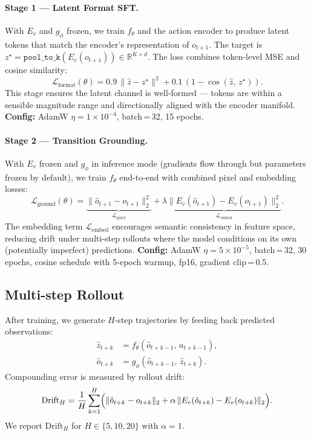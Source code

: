 \documentclass[11pt]{article}
\begin{document}
\paragraph{Stage 1 — Latent Format SFT.}
With $E_v$ and $g_\phi$ frozen, we train $f_\theta$ and the action encoder
to produce latent tokens that match the encoder's representation of $o_{t+1}$.
The target is $z^\star = \texttt{pool\_to\_k}(E_v(o_{t+1})) \in \mathbb{R}^{K \times d}$.
The loss combines token-level MSE and cosine similarity:
\begin{equation}
\mathcal{L}_\text{format}(\theta) = 0.9\,\|{\hat{z} - z^\star}\|^2
+ 0.1\,(1 - \cos(\hat{z},\, z^\star)).
\end{equation}
This stage ensures the latent channel is well-formed --- tokens are within
a sensible magnitude range and directionally aligned with the encoder manifold.
\textbf{Config:} AdamW $\eta=1\times10^{-4}$, batch\,=\,32, 15 epochs.

\paragraph{Stage 2 — Transition Grounding.}
With $E_v$ frozen and $g_\phi$ in inference mode (gradients flow through but
parameters frozen by default), we train $f_\theta$ end-to-end with combined
pixel and embedding losses:
\begin{equation}
\mathcal{L}_\text{ground}(\theta) =
\underbrace{\|{\hat{o}_{t+1} - o_{t+1}}\|_2^2}_{\mathcal{L}_\text{pixel}}
+ \lambda\underbrace{\|{E_v(\hat{o}_{t+1}) - E_v(o_{t+1})}\|_2^2}_{\mathcal{L}_\text{embed}}.
\end{equation}
The embedding term $\mathcal{L}_\text{embed}$ encourages semantic consistency
in feature space, reducing drift under multi-step rollouts where the model
conditions on its own (potentially imperfect) predictions.
\textbf{Config:} AdamW $\eta=5\times10^{-5}$, batch\,=\,32, 30 epochs,
cosine schedule with 5-epoch warmup, fp16, gradient clip\,=\,0.5.

\subsection{Multi-step Rollout}

After training, we generate $H$-step trajectories by feeding back
predicted observations:
\begin{align}
\hat{z}_{t+k} &= f_\theta(\hat{o}_{t+k-1},\, a_{t+k-1}),\\
\hat{o}_{t+k} &= g_\phi(\hat{o}_{t+k-1},\, \hat{z}_{t+k}).
\end{align}
Compounding error is measured by rollout drift:
\begin{equation}
\text{Drift}_H = \frac{1}{H}\sum_{k=1}^{H}
\Bigl(\|\hat{o}_{t+k} - o_{t+k}\|_2 + \alpha\,\|E_v(\hat{o}_{t+k}) - E_v(o_{t+k})\|_2\Bigr).
\end{equation}
We report $\text{Drift}_H$ for $H \in \{5, 10, 20\}$ with $\alpha=1$.
\end{document}
